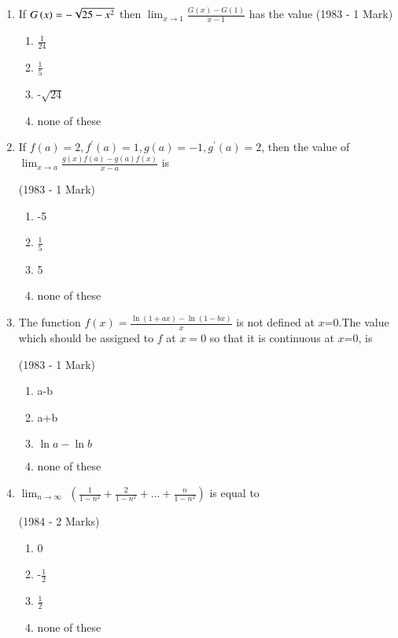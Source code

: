 \documentclass[journal,12pt,onecolumn]{IEEEtran}
\theoremstyle{remark}
\begin{document}
\begin{enumerate}
\begin{enumerate}
           
    \end{enumerate}

\item If $G\left(x\right)=-\sqrt{25-x^2}$ then $\lim_{x \to 1}\frac{G(x)-G(1)}{x-1}$ has the value
\hfill    (1983 - 1 Mark)
\begin{enumerate}
    \item $\frac{1}{24}$
    \item $\frac{1}{5}$
    \item -$\sqrt{24}$
    \item none of these
    
\end{enumerate}

\item If $f(a)=2,f^{\prime}(a)=1,g(a)=-1,g^{\prime}(a)=2$, then the value of $\lim_{x\to a}\frac{g(x)f(a)-g(a)f(x)}{x-a}$ is

  \hfill (1983 - 1 Mark)
     \begin{enumerate}
         \item -5
         \item $\frac{1}{5}$
         \item 5
         \item none of these
     \end{enumerate}

\item The function $f(x)=\frac{\ln{(1+ax)}-\ln{(1-bx)}}{x}$ is not defined at $x$=0.The value which should be assigned to $f$ at $x=0$ so that it is continuous at $x$=0, is

  \hfill              (1983 - 1 Mark)
    \begin{enumerate}
        \item a-b
        \item a+b
        \item $\ln{a}-\ln{b}$
        \item none of these
        
    \end{enumerate}

\item $\lim_{n\to \infty}$
      $\left(
      \frac{1}{1-n^2} + \frac{2}{1-n^2} +...+ \frac{n}{1-n^2}
       \right)$ is equal to
       
             \hfill(1984 - 2 Marks)
                 \begin{enumerate}
                    \item 0
                    \item -$\frac{1}{2}$
                    \item $\frac{1}{2}$
                    \item none of these
             

\end{enumerate}
\end{enumerate}
\end{document}
